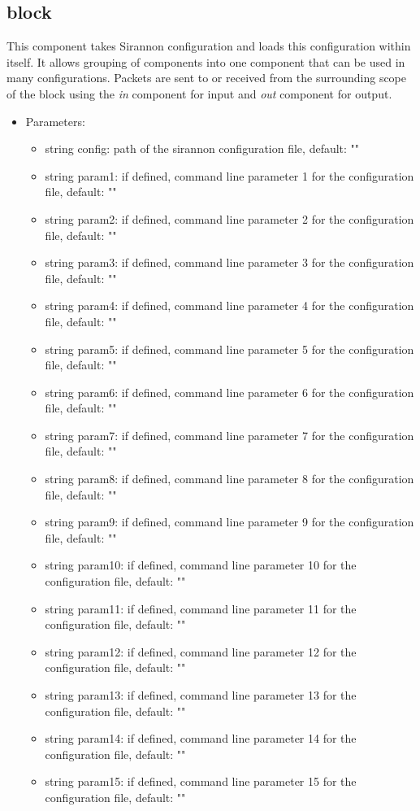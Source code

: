 \subsection{block}
This component takes Sirannon configuration and loads this configuration within itself. It allows grouping of components into one component that can be used in many configurations. Packets are sent to or received from the surrounding scope of the block using the \textit{in} component for input and \textit{out} component for output.
\begin{itemize}
\item Parameters:
\begin{itemize}
\item string config: path of the sirannon configuration file, default: ""
\item string param1: if defined, command line parameter 1 for the configuration file, default: ""
\item string param2: if defined, command line parameter 2 for the configuration file, default: ""
\item string param3: if defined, command line parameter 3 for the configuration file, default: ""
\item string param4: if defined, command line parameter 4 for the configuration file, default: ""
\item string param5: if defined, command line parameter 5 for the configuration file, default: ""
\item string param6: if defined, command line parameter 6 for the configuration file, default: ""
\item string param7: if defined, command line parameter 7 for the configuration file, default: ""
\item string param8: if defined, command line parameter 8 for the configuration file, default: ""
\item string param9: if defined, command line parameter 9 for the configuration file, default: ""
\item string param10: if defined, command line parameter 10 for the configuration file, default: ""
\item string param11: if defined, command line parameter 11 for the configuration file, default: ""
\item string param12: if defined, command line parameter 12 for the configuration file, default: ""
\item string param13: if defined, command line parameter 13 for the configuration file, default: ""
\item string param14: if defined, command line parameter 14 for the configuration file, default: ""
\item string param15: if defined, command line parameter 15 for the configuration file, default: ""
\end{itemize}
\end{itemize}
